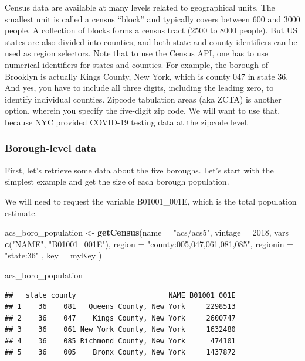 \documentclass[openany]{book}
\newenvironment{Shaded}{\begin{snugshade}}{\end{snugshade}}
\newcommand{\DataTypeTok}[1]{\textcolor[rgb]{0.13,0.29,0.53}{#1}}
\newcommand{\DecValTok}[1]{\textcolor[rgb]{0.00,0.00,0.81}{#1}}
\newcommand{\KeywordTok}[1]{\textcolor[rgb]{0.13,0.29,0.53}{\textbf{#1}}}
\newcommand{\NormalTok}[1]{#1}
\newcommand{\StringTok}[1]{\textcolor[rgb]{0.31,0.60,0.02}{#1}}
\begin{document}
Census data are available at many levels related to geographical units. The smallest unit is called a census ``block'' and typically covers between 600 and 3000 people. A collection of blocks forms a census tract (2500 to 8000 people). But US states are also divided into counties, and both state and county identifiers can be used as region selectors. Note that to use the Census API, one has to use numerical identifiers for states and counties. For example, the borough of Brooklyn is actually Kings County, New York, which is county 047 in state 36. And yes, you have to include all three digits, including the leading zero, to identify individual counties. Zipcode tabulation areas (aka ZCTA) is another option, wherein you specify the five-digit zip code. We will want to use that, because NYC provided COVID-19 testing data at the zipcode level.

\hypertarget{borough-level-data}{%
\subsubsection*{Borough-level data}\label{borough-level-data}}

First, let's retrieve some data about the five boroughs. Let's start with the simplest example and get the size of each borough population.

We will need to request the variable B01001\_001E, which is the total population estimate.

\begin{Shaded}
\begin{Highlighting}[]
\NormalTok{acs_boro_population <-}\StringTok{ }\KeywordTok{getCensus}\NormalTok{(}\DataTypeTok{name =} \StringTok{"acs/acs5"}\NormalTok{,}
                         \DataTypeTok{vintage =} \DecValTok{2018}\NormalTok{,}
                         \DataTypeTok{vars =} \KeywordTok{c}\NormalTok{(}\StringTok{"NAME"}\NormalTok{, }\StringTok{"B01001_001E"}\NormalTok{),}
                         \DataTypeTok{region =} \StringTok{"county:005,047,061,081,085"}\NormalTok{,}
                         \DataTypeTok{regionin =} \StringTok{"state:36"}\NormalTok{ , }\DataTypeTok{key =}\NormalTok{ myKey}
\NormalTok{                         )}

\NormalTok{acs_boro_population}
\end{Highlighting}
\end{Shaded}

\begin{verbatim}
##   state county                      NAME B01001_001E
## 1    36    081   Queens County, New York     2298513
## 2    36    047    Kings County, New York     2600747
## 3    36    061 New York County, New York     1632480
## 4    36    085 Richmond County, New York      474101
## 5    36    005    Bronx County, New York     1437872
\end{verbatim}
\end{document}
